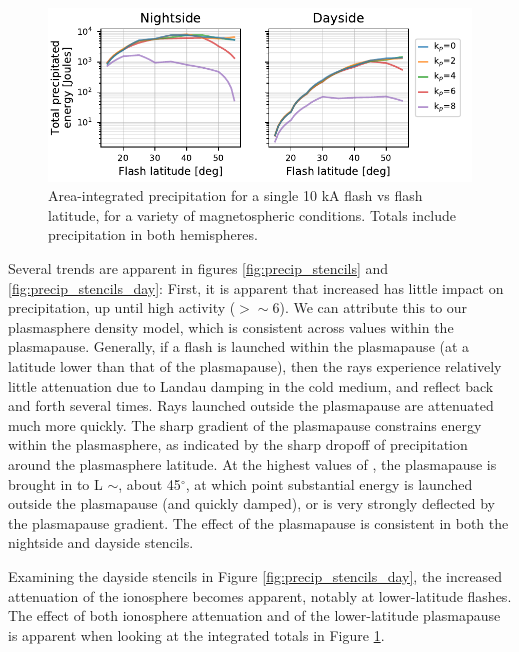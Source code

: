 \begin{figure}[]
\begin{center}
\includegraphics{figures/total_energy_vs_latitude.pdf}
\caption[Total precipitated energy for a single flash]{Area-integrated precipitation for a single 10 kA flash vs flash latitude, for a variety of magnetospheric conditions. Totals include precipitation in both hemispheres.}
\label{fig:total_energy_per_stencil}
\end{center}
\end{figure}

Several trends are apparent in figures \ref{fig:precip_stencils} and \ref{fig:precip_stencils_day}: First, it is apparent that increased \kp{} has little impact on precipitation, up until high activity (\kp{}$ > \sim 6$). We can attribute this to our plasmasphere density model, which is consistent across \kp{} values within the plasmapause. Generally, if a flash is launched within the plasmapause (at a latitude lower than that of the plasmapause), then the rays experience relatively little attenuation due to Landau damping in the cold medium, and reflect back and forth several times. Rays launched outside the plasmapause are attenuated much more quickly. The sharp gradient of the plasmapause constrains energy within the plasmasphere, as indicated by the sharp dropoff of precipitation around the plasmasphere latitude. At the highest values of \kp{}, the plasmapause is brought in to L $\sim$, about 45$^\circ$, at which point substantial energy is launched outside the plasmapause (and quickly damped), or is very strongly deflected by the plasmapause gradient. The effect of the plasmapause is consistent in both the nightside and dayside stencils.

Examining the dayside stencils in Figure \ref{fig:precip_stencils_day}, the increased attenuation of the ionosphere becomes apparent, notably at lower-latitude flashes. The effect of both ionosphere attenuation and of the lower-latitude plasmapause is apparent when looking at the integrated totals in Figure \ref{fig:total_energy_per_stencil}.

